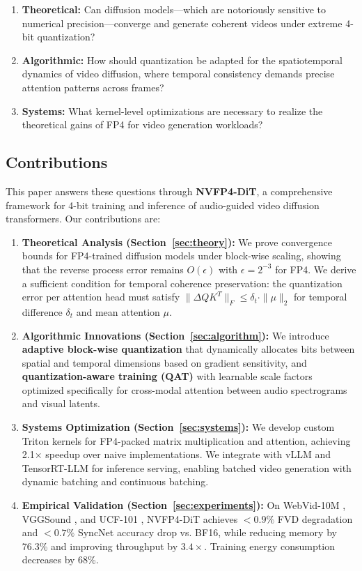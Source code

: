 \documentclass[journal]{IEEEtran}
\theoremstyle{definition}
\theoremstyle{remark}
\begin{document}
\begin{enumerate}
    \item \textbf{Theoretical:} Can diffusion models---which are notoriously sensitive to numerical precision---converge and generate coherent videos under extreme 4-bit quantization?
    \item \textbf{Algorithmic:} How should quantization be adapted for the spatiotemporal dynamics of video diffusion, where temporal consistency demands precise attention patterns across frames?
    \item \textbf{Systems:} What kernel-level optimizations are necessary to realize the theoretical gains of FP4 for video generation workloads?
\end{enumerate}

\subsection{Contributions}
This paper answers these questions through \textbf{NVFP4-DiT}, a comprehensive framework for 4-bit training and inference of audio-guided video diffusion transformers. Our contributions are:

\begin{enumerate}
    \item \textbf{Theoretical Analysis (Section~\ref{sec:theory}):} We prove convergence bounds for FP4-trained diffusion models under block-wise scaling, showing that the reverse process error remains $O(\epsilon)$ with $\epsilon = 2^{-3}$ for FP4. We derive a sufficient condition for temporal coherence preservation: the quantization error per attention head must satisfy $\|\Delta Q K^T\|_F \leq \delta_t \cdot \|\mu\|_2$ for temporal difference $\delta_t$ and mean attention $\mu$.
    
    \item \textbf{Algorithmic Innovations (Section~\ref{sec:algorithm}):} We introduce \textbf{adaptive block-wise quantization} that dynamically allocates bits between spatial and temporal dimensions based on gradient sensitivity, and \textbf{quantization-aware training (QAT)} with learnable scale factors optimized specifically for cross-modal attention between audio spectrograms and visual latents.
    
    \item \textbf{Systems Optimization (Section~\ref{sec:systems}):} We develop custom Triton \cite{tillet2019triton} kernels for FP4-packed matrix multiplication and attention, achieving 2.1$\times$ speedup over naive implementations. We integrate with vLLM \cite{kwon2023efficient} and TensorRT-LLM \cite{nvidia2024tensorrt} for inference serving, enabling batched video generation with dynamic batching and continuous batching.
    
    \item \textbf{Empirical Validation (Section~\ref{sec:experiments}):} On WebVid-10M \cite{bain2021frozen}, VGGSound \cite{chen2020vggsound}, and UCF-101 \cite{soomro2012ucf101}, NVFP4-DiT achieves $<0.9\%$ FVD degradation and $<0.7\%$ SyncNet accuracy drop vs. BF16, while reducing memory by 76.3\% and improving throughput by $3.4\times$. Training energy consumption decreases by 68\%.
\end{enumerate}
\end{document}

